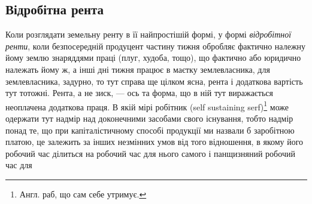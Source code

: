 \subsection{Відробітна рента}

Коли розглядати земельну ренту в її найпростішій формі, у формі \emph{відробітної
ренти}, коли безпосередній продуцент частину тижня обробляє фактично
належну йому землю знаряддями праці (плуг, худоба, тощо), що фактично
або юридично належать йому ж, а інші дні тижня працює в маєтку землевласника,
для землевласника, задурно, то тут справа ще цілком ясна, рента і додаткова вартість
тут тотожні. Рента, а не зиск, — ось та форма, що в ній тут виражається неоплачена
додаткова праця. В якій мірі робітник (self sustaining serf)\footnote*{
Англ. раб, що сам себе утримує. 
} може одержати тут
надмір над доконечними засобами свого існування, тобто надмір понад те, що
при капіталістичному способі продукції ми назвали б заробітною платою, це
залежить за інших незмінних умов від того відношення, в якому його робочий
час ділиться на робочий час для нього самого і панщизняний робочий час для
\parbreak{}  %
